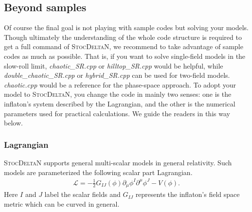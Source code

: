 \documentclass[aps, prd
, preprint
, nofootinbib 
, notitlepage
, superscriptaddress
, longbibliography
]{revtex4-1}
\newcommand{\calL}{\mathcal{L}}
\newcommand{\bae}[1]{\begin{align} #1 \end{align}}
\begin{document}
\subsection{Beyond samples}

Of course the final goal is not playing with sample codes but solving your models. Though ultimately the understanding of the whole code structure is required
to get a full command of \textsc{StocDeltaN}, we recommend to take advantage of sample codes as much as possible. That is, if you want to solve single-field models in the slow-roll limit,
\textit{chaotic\_SR.cpp} or \textit{hilltop\_SR.cpp} would be helpful, while \textit{double\_chaotic\_SR.cpp} or \textit{hybrid\_SR.cpp} can be used for two-field models. \textit{chaotic.cpp} would be a reference for the phase-space approach.
To adopt your model to \textsc{StocDeltaN}, you change the code in mainly two senses: one is the inflaton's system described by the Lagrangian, and the other is 
the numerical parameters used for practical calculations. We guide the readers in this way below.

\subsubsection{Lagrangian}

\textsc{StocDeltaN} supports general multi-scalar models in general relativity. Such models are parameterized the following scalar part Lagrangian.
\bae{\label{eq: Lagrangian}
	\calL=-\frac{1}{2}G_{IJ}(\phi)\partial_\mu\phi^I\partial^\mu\phi^J-V(\phi).
}
Here $I$ and $J$ label the scalar fields and $G_{IJ}$ represents the inflaton's field space metric which can be curved in general.
\end{document}
